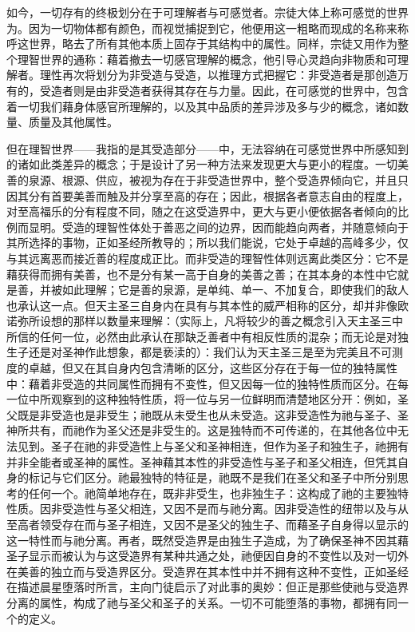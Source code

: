如今，一切存有的终极划分在于可理解者与可感觉者。宗徒大体上称可感觉的世界为。因为一切物体都有颜色，而视觉捕捉到它，他便用这一粗略而现成的名称来称呼这世界，略去了所有其他本质上固存于其结构中的属性。同样，宗徒又用作为整个理智世界的通称：藉着撤去一切感官理解的概念，他引导心灵趋向非物质和可理解者。理性再次将划分为非受造与受造，以推理方式把握它：非受造者是那创造万有的，受造者则是由非受造者获得其存在与力量。因此，在可感觉的世界中，包含着一切我们藉身体感官所理解的，以及其中品质的差异涉及多与少的概念，诸如数量、质量及其他属性。\par

但在理智世界——我指的是其受造部分——中，无法容纳在可感觉世界中所感知到的诸如此类差异的概念；于是设计了另一种方法来发现更大与更小的程度。一切美善的泉源、根源、供应，被视为存在于非受造世界中，整个受造界倾向它，并且只因其分有首要美善而触及并分享至高的存在；因此，根据各者意志自由的程度上，对至高福乐的分有程度不同，随之在这受造界中，更大与更小便依据各者倾向的比例而显明。受造的理智性体处于善恶之间的边界，因而能趋向两者，并随意倾向于其所选择的事物，正如圣经所教导的；所以我们能说，它处于卓越的高峰多少，仅与其远离恶而接近善的程度成正比。而非受造的理智性体则远离此类区分：它不是藉获得而拥有美善，也不是分有某一高于自身的美善之善；在其本身的本性中它就是善，并被如此理解；它是善的泉源，是单纯、单一、不加复合，即使我们的敌人也承认这一点。但天主圣三自身内在具有与其本性的威严相称的区分，却并非像欧诺弥所设想的那样以数量来理解：（实际上，凡将较少的善之概念引入天主圣三中所信的任何一位，必然由此承认在那缺乏善者中有相反性质的混杂；而无论是对独生子还是对圣神作此想象，都是亵渎的）：我们认为天主圣三是至为完美且不可测度的卓越，但又在其自身内包含清晰的区分，这些区分存在于每一位的独特属性中：藉着非受造的共同属性而拥有不变性，但又因每一位的独特性质而区分。在每一位中所观察到的这种独特性质，将一位与另一位鲜明而清楚地区分开：例如，圣父既是非受造也是非受生；祂既从未受生也从未受造。这非受造性为祂与圣子、圣神所共有，而祂作为圣父还是非受生的。这是独特而不可传递的，在其他各位中无法见到。圣子在祂的非受造性上与圣父和圣神相连，但作为圣子和独生子，祂拥有并非全能者或圣神的属性。圣神藉其本性的非受造性与圣子和圣父相连，但凭其自身的标记与它们区分。祂最独特的特征是，祂既不是我们在圣父和圣子中所分别思考的任何一个。祂简单地存在，既非非受生，也非独生子：这构成了祂的主要独特性质。因非受造性与圣父相连，又因不是而与祂分离。因非受造性的纽带以及与从至高者领受存在而与圣子相连，又因不是圣父的独生子、而藉圣子自身得以显示的这一特性而与祂分离。再者，既然受造界是由独生子造成，为了确保圣神不因其藉圣子显示而被认为与这受造界有某种共通之处，祂便因自身的不变性以及对一切外在美善的独立而与受造界区分。受造界在其本性中并不拥有这种不变性，正如圣经在描述晨星堕落时所言，主向门徒启示了对此事的奥妙：但正是那些使祂与受造界分离的属性，构成了祂与圣父和圣子的关系。一切不可能堕落的事物，都拥有同一个的定义。\par

